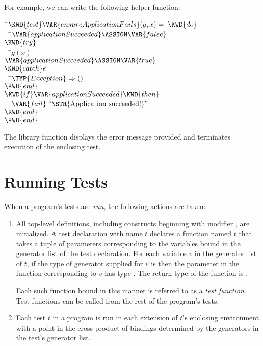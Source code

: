 For example, we can write the following helper function:
\begin{Fortress}
{\tt~}\pushtabs\=\+\( \KWD{test} \VAR{ensureApplicationFails}(g,x) = \;\KWD{do}\)\\
{\tt~~}\pushtabs\=\+\(   \VAR{applicationSucceeded} \ASSIGN \VAR{false}\)\\
\(   \KWD{try}\)\\
{\tt~~}\pushtabs\=\+\(     g(x)\)\\
\(     \VAR{applicationSucceeded} \ASSIGN \VAR{true}\)\-\\\poptabs
\(   \KWD{catch} e\)\\
{\tt~~}\pushtabs\=\+\(     \TYP{Exception} \Rightarrow ()\)\-\\\poptabs
\(   \KWD{end}\)\\
\(   \KWD{if} \VAR{applicationSucceeded} \KWD{then}\)\\
{\tt~~}\pushtabs\=\+\(     \VAR{fail}\;\hbox{\rm``\STR{Application~succeeded!}''}\)\-\\\poptabs
\(   \KWD{end}\)\-\\\poptabs
\( \KWD{end}\)\-\\\poptabs
\end{Fortress}

The library function  displays the error message provided
and terminates execution of the enclosing test.

\section{Running Tests}

When a program's tests are \emph{run}, the following actions are
taken:
\begin{enumerate}
\item All top-level
definitions, including constructs beginning with modifier , are
initialized. A test declaration with name $t$ declares a function named $t$
that takes a tuple of parameters corresponding to the variables bound in
the generator list of the test declaration.
For each variable $v$ in the generator list
of $t$, if the type of generator supplied for $v$ is
then the parameter in the function corresponding to $v$ has type
\EXP{\mathrm{\alpha}}. The return type of the function is \EXP{()}.

Each such function bound in this manner is referred to as a
\emph{test function}.
Test functions can be called from the rest of the program's tests.

\item Each test $t$ in a program is run in each extension of
$t$'s enclosing environment with a point in the cross product
of bindings determined by the generators in the test's generator list.
\end{enumerate}


